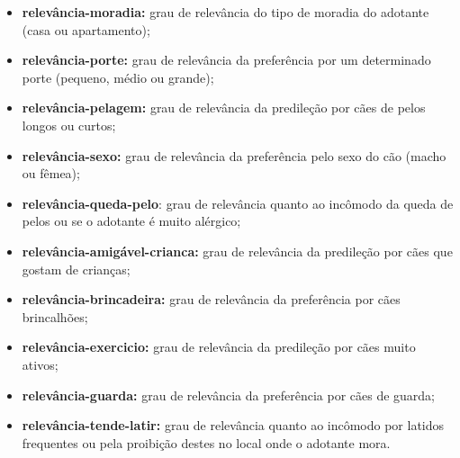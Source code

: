 \documentclass[portuguese]{textolivre}
\begin{document}
\begin{itemize}
    \item \textbf{relevância-moradia:} grau de relevância do tipo de moradia do adotante (casa ou apartamento);
    \item \textbf{relevância-porte:} grau de relevância da preferência por um determinado porte (pequeno, médio ou grande);
    \item \textbf{relevância-pelagem:} grau de relevância da predileção por cães de pelos longos ou curtos;
    \item \textbf{relevância-sexo:} grau de relevância da preferência pelo sexo do cão (macho ou fêmea);
    \item \textbf{relevância-queda-pelo}: grau de relevância quanto ao incômodo da queda de pelos ou se o adotante é muito alérgico;
     \item \textbf{relevância-amigável-crianca:} grau de relevância da predileção por cães que gostam de crianças;
     \item \textbf{relevância-brincadeira:} grau de relevância da preferência por cães brincalhões;
     \item \textbf{relevância-exercicio:} grau de relevância da predileção por cães muito ativos;
     \item \textbf{relevância-guarda:} grau de relevância da preferência por cães de guarda;
     \item \textbf{relevância-tende-latir:} grau de relevância quanto ao incômodo por latidos frequentes ou pela proibição destes no local onde o adotante mora.
 \end{itemize}
\end{document}
